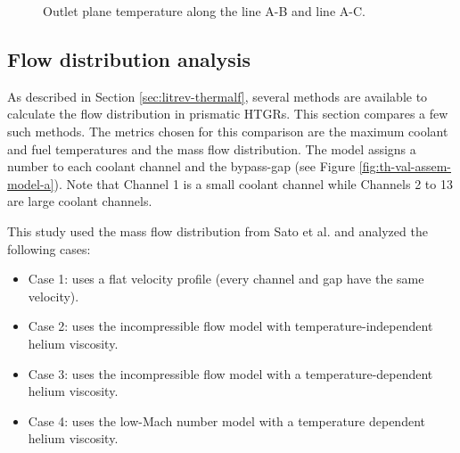 \begin{figure}[htbp!]
  \centering
  \hfill
  \caption{Outlet plane temperature along the line A-B and line A-C.}
  \label{fig:th-val-assem-temps}
\end{figure}

\subsection{Flow distribution analysis}
\label{sec:flowdistrib}

As described in Section \ref{sec:litrev-thermalf}, several methods are available to calculate the flow distribution in prismatic HTGRs.
This section compares a few such methods.
The metrics chosen for this comparison are the maximum coolant and fuel temperatures and the mass flow distribution.
The model assigns a number to each coolant channel and the bypass-gap (see Figure \ref{fig:th-val-assem-model-a}).
Note that Channel 1 is a small coolant channel while Channels 2 to 13 are large coolant channels.

This study used the mass flow distribution from Sato et al. \cite{sato_computational_2010} and analyzed the following cases:
\begin{itemize}
    \item Case 1: uses a flat velocity profile (every channel and gap have the same velocity).
    \item Case 2: uses the incompressible flow model with temperature-independent helium viscosity.
    \item Case 3: uses the incompressible flow model with a temperature-dependent helium viscosity.
    \item Case 4: uses the low-Mach number model with a temperature dependent helium viscosity.
\end{itemize}


